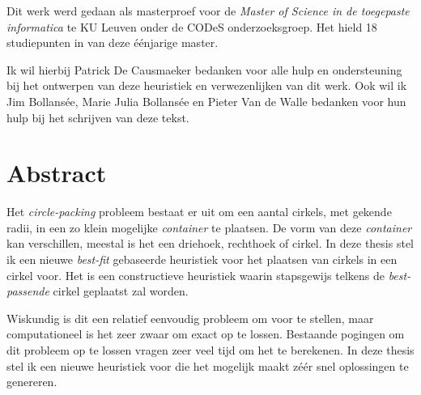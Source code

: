 \documentclass[12pt,a4paper,oneside]{book}
\begin{document}
Dit werk werd gedaan als masterproef voor de \textit{Master of Science in de toegepaste informatica} te KU Leuven onder de CODeS onderzoeksgroep.
Het hield 18 studiepunten in van deze éénjarige master.

Ik wil hierbij Patrick De Causmaeker bedanken voor alle hulp en ondersteuning bij het ontwerpen van deze heuristiek en verwezenlijken van dit werk.
Ook wil ik Jim Bollansée, Marie Julia Bollansée en Pieter Van de Walle bedanken voor hun hulp bij het schrijven van deze tekst.


\newpage

\chapter*{Abstract}


Het \textit{circle-packing} probleem bestaat er uit om een aantal cirkels, met gekende radii, in een zo klein mogelijke \textit{container} te plaatsen.
De vorm van deze \textit{container} kan verschillen, meestal is het een driehoek, rechthoek of cirkel.
In deze thesis stel ik een nieuwe \textit{best-fit} gebaseerde heuristiek voor het plaatsen van cirkels in een cirkel voor.
Het is een constructieve heuristiek waarin stapsgewijs telkens de \textit{best-passende} cirkel geplaatst zal worden.

Wiskundig is dit een relatief eenvoudig probleem om voor te stellen, maar computationeel is het zeer zwaar om exact op te lossen.
Bestaande pogingen om dit probleem op te lossen vragen zeer veel tijd om het te berekenen.
In deze thesis stel ik een nieuwe heuristiek voor die het mogelijk maakt zéér snel oplossingen te genereren.
\end{document}
